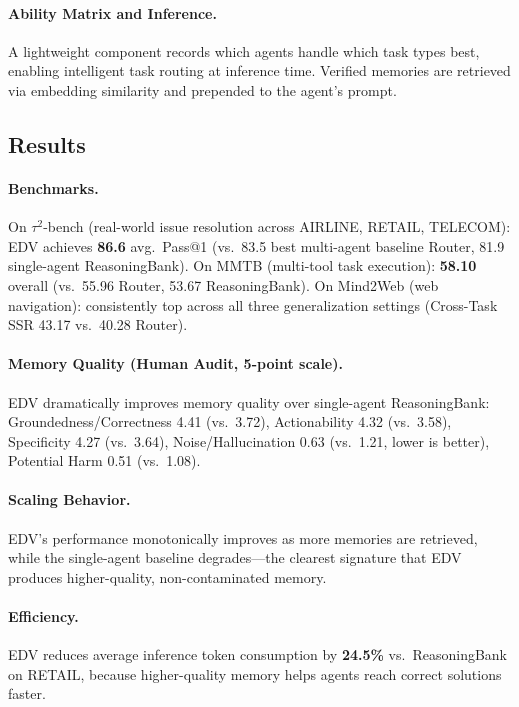 \documentclass[11pt,a4paper]{article}
\begin{document}
\paragraph{Ability Matrix and Inference.} A lightweight component records which agents handle which task types best, enabling intelligent task routing at inference time. Verified memories are retrieved via embedding similarity and prepended to the agent's prompt.

\subsection{Results}

\paragraph{Benchmarks.} On $\tau^2$-bench (real-world issue resolution across AIRLINE, RETAIL, TELECOM): EDV achieves \textbf{86.6} avg.\ Pass@1 (vs.\ 83.5 best multi-agent baseline Router, 81.9 single-agent ReasoningBank). On MMTB (multi-tool task execution): \textbf{58.10} overall (vs.\ 55.96 Router, 53.67 ReasoningBank). On Mind2Web (web navigation): consistently top across all three generalization settings (Cross-Task SSR 43.17 vs.\ 40.28 Router).

\paragraph{Memory Quality (Human Audit, 5-point scale).}
EDV dramatically improves memory quality over single-agent ReasoningBank: Groundedness/Correctness 4.41 (vs.\ 3.72), Actionability 4.32 (vs.\ 3.58), Specificity 4.27 (vs.\ 3.64), Noise/Hallucination 0.63 (vs.\ 1.21, lower is better), Potential Harm 0.51 (vs.\ 1.08).

\paragraph{Scaling Behavior.} EDV's performance monotonically improves as more memories are retrieved, while the single-agent baseline degrades---the clearest signature that EDV produces higher-quality, non-contaminated memory.

\paragraph{Efficiency.} EDV reduces average inference token consumption by \textbf{24.5\%} vs.\ ReasoningBank on RETAIL, because higher-quality memory helps agents reach correct solutions faster.
\end{document}
